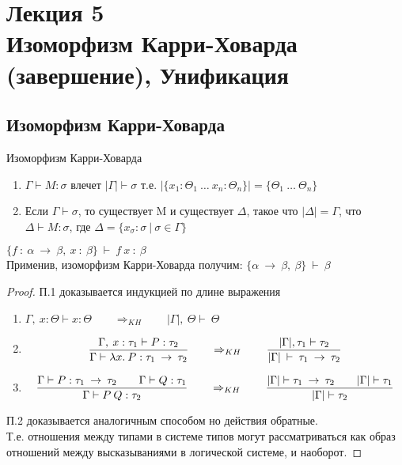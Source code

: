 \section{Лекция 5 \\ Изоморфизм Карри-Ховарда (завершение), Унификация}
		\subsection{Изоморфизм Карри-Ховарда}
	\begin{definition}Изоморфизм Карри-Ховарда\end{definition}

	\begin{enumerate}
		\item $\Gamma\vdash M:\sigma$ влечет $|\Gamma|\vdash \sigma$ т.е. $|\{x_1:\Theta_1\:\hdots \:x_n:\Theta_n\}|=\{\Theta_1\:\hdots\:\Theta_n\}$
		\item Если $\Gamma\vdash\sigma$, то существует M и существует $\Delta$, такое что $|\Delta|=\Gamma$, что $\Delta \vdash M: \sigma$, где $\Delta=\{x_{\sigma} : \sigma\:|\:\sigma\in\Gamma  \}$
	\end{enumerate}
	\begin{example}
	$\{f\: :\:\alpha\:\rightarrow\:\beta,\:x\: :\:\beta\}\:\vdash\:f\:x\::\:\beta$ \\Применив, изоморфизм Карри-Ховарда получим: $\{\alpha\:\rightarrow\:\beta,\:\beta\}\:\vdash\:\beta$
	\end{example}
	\begin{proof}
		\par П.1 доказывается индукцией по длине выражения
			\begin{enumerate}
				\item $\Gamma,\:x:\Theta\vdash x:\Theta \qquad \Rightarrow_{KH} \qquad |\Gamma|,\:\Theta\vdash\:\Theta$
				\item $${\Gamma,\:x:\tau_1\vdash P:\tau_2 \over \Gamma \vdash \lambda x.\:P:\tau_1\:\rightarrow\:\tau_2} \qquad \Rightarrow_{KH} \qquad {|\Gamma|, \tau_1\vdash\tau_2\over |\Gamma|\:\vdash\:\tau_1\:\rightarrow\:\tau_2}$$
				\item $${\Gamma\vdash P:\tau_1\:\rightarrow\:\tau_2 \hspace{2em} \Gamma\vdash Q:\tau_1 \over \Gamma \vdash P\:Q:\tau_2} \qquad \Rightarrow_{KH} \qquad {|\Gamma|\vdash \tau_1\:\rightarrow\:\tau_2 \hspace{2em} |\Gamma|\vdash \tau_1 \over |\Gamma| \vdash \tau_2}$$
			\end{enumerate}
\par П.2 доказывается аналогичным способом но действия обратные.\\
Т.е. отношения между типами в системе типов могут рассматриваться как образ отношений между высказываниями в логической системе, и наоборот.
\end{proof}

